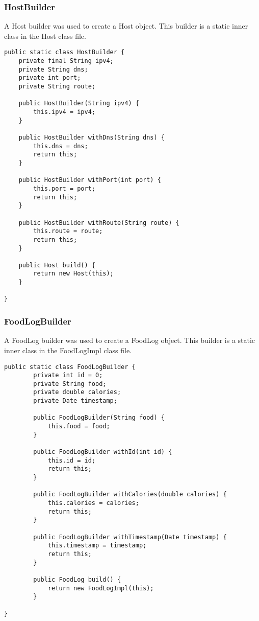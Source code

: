 \tocless\subsubsection{HostBuilder}
A Host builder was used to create a Host object.
This builder is a static inner class in the Host class file.
\begin{lstlisting}[style=Java]
public static class HostBuilder {
    private final String ipv4;
    private String dns;
    private int port;
    private String route;

    public HostBuilder(String ipv4) {
        this.ipv4 = ipv4;
    }

    public HostBuilder withDns(String dns) {
        this.dns = dns;
        return this;
    }

    public HostBuilder withPort(int port) {
        this.port = port;
        return this;
    }

    public HostBuilder withRoute(String route) {
        this.route = route;
        return this;
    }

    public Host build() {
        return new Host(this);
    }

}
\end{lstlisting}

\tocless\subsubsection{FoodLogBuilder}
A FoodLog builder was used to create a FoodLog object.
This builder is a static inner class in the FoodLogImpl class file.
\begin{lstlisting}[style=Java]
public static class FoodLogBuilder {
        private int id = 0;
        private String food;
        private double calories;
        private Date timestamp;

        public FoodLogBuilder(String food) {
            this.food = food;
        }

        public FoodLogBuilder withId(int id) {
            this.id = id;
            return this;
        }

        public FoodLogBuilder withCalories(double calories) {
            this.calories = calories;
            return this;
        }

        public FoodLogBuilder withTimestamp(Date timestamp) {
            this.timestamp = timestamp;
            return this;
        }

        public FoodLog build() {
            return new FoodLogImpl(this);
        }

}
\end{lstlisting}

